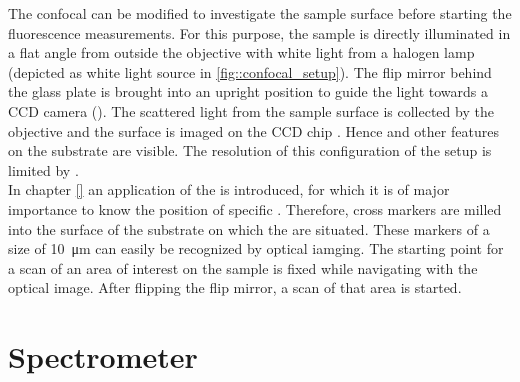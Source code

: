 		The confocal can be modified to investigate the sample surface before starting the fluorescence measurements.
		For this purpose, the sample is directly illuminated in a flat angle from outside the objective with white light from a halogen lamp (depicted as white light source in \autoref{fig::confocal_setup}). 
		The flip mirror behind the glass plate is brought into an upright position to guide the light towards a CCD camera ().
		The scattered light from the sample surface is collected by the objective and the surface is imaged on the CCD chip .
		Hence \Nds and other features on the substrate are visible.
		The resolution of this configuration of the setup is limited by .
		\\
		In chapter \autoref{} an application of the \nd is introduced, for which it is of major importance to know the position of specific \nds.
		Therefore, cross markers are milled into the surface of the substrate on which the \nds are situated.
		These markers of a size of \SI{10}{\micro\meter} can easily be recognized by optical iamging.
		The starting point for a scan of an area of interest on the sample is fixed while navigating with the optical image.
		After flipping the flip mirror, a \pl scan of that area is started.

	\section[Spectrometer]{Spectrometer} \label{sec::methods_spectrometer}

